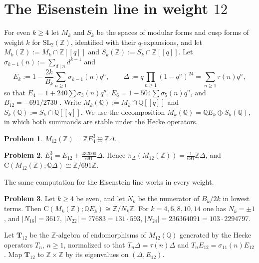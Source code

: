\documentclass[reqno]{amsart}
\theoremstyle{definition}
\newtheorem{problem}{Problem}[section]
\theoremstyle{plain}
\newcommand{\Z}{\mathbb{Z}}
\newcommand{\Q}{\mathbb{Q}}
\newcommand{\T}{\mathbf{T}}
\newcommand{\Cg}{\mathrm{C}}
\begin{document}
\section{The Eisenstein line in weight \texorpdfstring{\(12\)}{12}}\label{sec:691}

For even \(k \ge 4\) let \(M_k\) and \(S_k\) be the spaces of modular forms and cusp forms of weight \(k\) for \(\mathrm{SL}_2(\Z)\), identified with their \(q\)-expansions, and let \(M_k(\Z) := M_k \cap \Z[[q]]\) and \(S_k(\Z) := S_k \cap \Z[[q]]\).  Let \(\sigma_{k-1}(n) := \sum_{d \mid n} d^{k-1}\) and
\[
  E_k := 1 - \frac{2k}{B_k} \sum_{n \ge 1} \sigma_{k-1}(n) q^n , \qquad \Delta := q \prod_{n \ge 1} (1 - q^n)^{24} = \sum_{n \ge 1} \tau(n) q^n ,
\]
so that \(E_4 = 1 + 240 \sum \sigma_3(n) q^n\), \(E_6 = 1 - 504 \sum \sigma_5(n) q^n\), and \(B_{12} = -691/2730\) \cite[Ch.~VII, \S4]{SeA}.  Write \(M_k(\Q):=M_k\cap\Q[[q]]\) and \(S_k(\Q):=S_k\cap\Q[[q]]\).  We use the decomposition \(M_k(\Q)=\Q E_k\oplus S_k(\Q)\), in which both summands are stable under the Hecke operators.

\begin{problem}\label{pr:basis12}
\(M_{12}(\Z) = \Z E_4^3 \oplus \Z \Delta\).
\end{problem}

\begin{problem}\label{pr:691}
\(E_4^3 = E_{12} + \frac{432000}{691}\Delta\).  Hence \(\pi_\Delta(M_{12}(\Z)) = \frac{1}{691}\Z\Delta\), and \(\Cg(M_{12}(\Z); \Q\Delta) \cong \Z/691\Z\).
\end{problem}

The same computation for the Eisenstein line works in every weight.

\begin{problem}\label{pr:bernoulli}
Let \(k \ge 4\) be even, and let \(N_k\) be the numerator of \(B_k/2k\) in lowest terms.  Then \(\Cg(M_k(\Z); \Q E_k) \cong \Z/N_k\Z\).  For \(k = 4, 6, 8, 10, 14\) one has \(N_k = \pm1\), and \(\lvert N_{16} \rvert = 3617\), \(\lvert N_{22} \rvert = 77683 = 131 \cdot 593\), \(\lvert N_{24} \rvert = 236364091 = 103 \cdot 2294797\).
\end{problem}

Let \(\T_{12}\) be the \(\Z\)-algebra of endomorphisms of \(M_{12}(\Q)\) generated by the Hecke operators \(T_n\), \(n \ge 1\), normalized so that \(T_n \Delta = \tau(n)\Delta\) and \(T_n E_{12} = \sigma_{11}(n) E_{12}\) \cite[Ch.~VII, \S5]{SeA}.  Map \(\T_{12}\) to \(\Z \times \Z\) by its eigenvalues on \((\Delta, E_{12})\).
\end{document}
